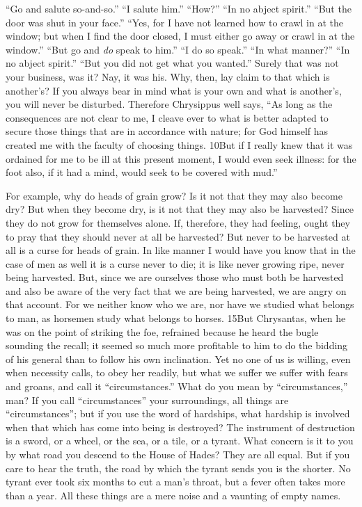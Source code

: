 ``Go and salute so-and-so.'' ``I salute him.'' ``How?'' ``In no abject spirit.'' ``But the door was shut in your face.'' ``Yes, for I have not learned how to crawl in at the window; but when I find the door closed, I must either go away or crawl in at the window.'' ``But go and \emph{do} speak to him.'' ``I do so speak.'' ``In what manner?'' ``In no abject spirit.'' ``But you did not get what you wanted.'' Surely that was not your business, was it? Nay, it was his. Why, then, lay claim to that which is another's? If you always bear in mind what is your own and what is another's, you will never be disturbed. Therefore Chrysippus well says, ``As long as the consequences are not clear to me, I cleave ever to what is better adapted to secure those things that are in accordance with nature; for God himself has created me with the faculty of choosing things. 10But if I really knew that it was ordained for me to be ill at this present moment, I would even seek illness: for the foot also, if it had a mind, would seek to be covered with mud.''

For example, why do heads of grain grow? Is it not that they may also become dry? But when they become dry, is it not that they may also be harvested? Since they do not grow for themselves alone. If, therefore, they had feeling, ought they to pray that they should never at all be harvested? But never to be harvested at all is a curse for heads of grain. In like manner I would have you know that in the case of men as well it is a curse never to die; it is like never growing ripe, never being harvested. But, since we are ourselves those who must both be harvested and also be aware of the very fact that we are being harvested, we are angry on that account. For we neither know who we are, nor have we studied what belongs to man, as horsemen study what belongs to horses. 15But Chrysantas, when he was on the point of striking the foe, refrained because he heard the bugle sounding the recall; it seemed so much more profitable to him to do the bidding of his general than to follow his own inclination. Yet no one of us is willing, even when necessity calls, to obey her readily, but what we suffer we suffer with fears and groans, and call it ``circumstances.'' What do you mean by ``circumstances,'' man? If you call ``circumstances'' your surroundings, all things are ``circumstances''; but if you use the word of hardships, what hardship is involved when that which has come into being is destroyed? The instrument of destruction is a sword, or a wheel, or the sea, or a tile, or a tyrant. What concern is it to you by what road you descend to the House of Hades? They are all equal. But if you care to hear the truth, the road by which the tyrant sends you is the shorter. No tyrant ever took six months to cut a man's throat, but a fever often takes more than a year. All these things are a mere noise and a vaunting of empty names.

